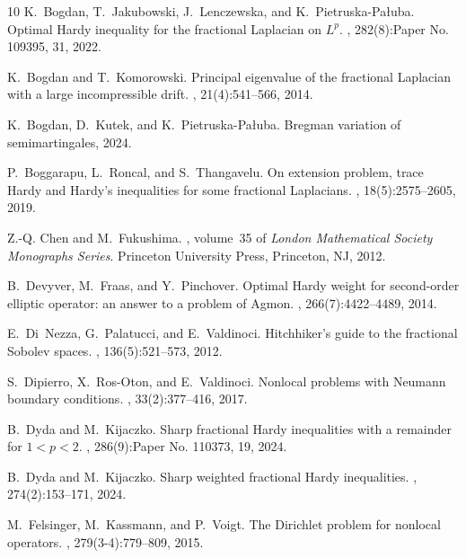 \documentclass[12pt, a4paper]{amsart}
\begin{document}
\begin{thebibliography}{10}
K.~Bogdan, T.~Jakubowski, J.~Lenczewska, and K.~Pietruska-Pa{\l}uba.
\newblock Optimal {H}ardy inequality for the fractional {L}aplacian on {$L^p$}.
, 282(8):Paper No. 109395, 31, 2022.

K.~Bogdan and T.~Komorowski.
\newblock Principal eigenvalue of the fractional {L}aplacian with a large incompressible drift.
, 21(4):541--566, 2014.

K.~Bogdan, D.~Kutek, and K.~Pietruska-Pa\l{}uba.
\newblock Bregman variation of semimartingales, 2024.

P.~Boggarapu, L.~Roncal, and S.~Thangavelu.
\newblock On extension problem, trace {H}ardy and {H}ardy's inequalities for some fractional {L}aplacians.
, 18(5):2575--2605, 2019.

Z.-Q. Chen and M.~Fukushima.
, volume~35 of {\em London Mathematical Society Monographs Series}.
\newblock Princeton University Press, Princeton, NJ, 2012.

B.~Devyver, M.~Fraas, and Y.~Pinchover.
\newblock Optimal {H}ardy weight for second-order elliptic operator: an answer to a problem of {A}gmon.
, 266(7):4422--4489, 2014.

E.~Di~Nezza, G.~Palatucci, and E.~Valdinoci.
\newblock Hitchhiker's guide to the fractional {S}obolev spaces.
, 136(5):521--573, 2012.

S.~Dipierro, X.~Ros-Oton, and E.~Valdinoci.
\newblock Nonlocal problems with {N}eumann boundary conditions.
, 33(2):377--416, 2017.

B.~Dyda and M.~Kijaczko.
\newblock Sharp fractional {H}ardy inequalities with a remainder for {$1 < p < 2$}.
, 286(9):Paper No. 110373, 19, 2024.

B.~Dyda and M.~Kijaczko.
\newblock Sharp weighted fractional {H}ardy inequalities.
, 274(2):153--171, 2024.

M.~Felsinger, M.~Kassmann, and P.~Voigt.
\newblock The {D}irichlet problem for nonlocal operators.
, 279(3-4):779--809, 2015.


\end{thebibliography}
\end{document}
